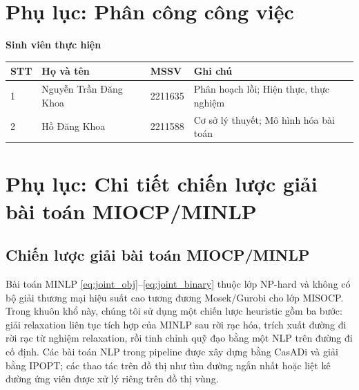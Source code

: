 \addto{}
\appendixtitleon
\appendixtitletocon
\begin{appendices}

    \chapter{Phụ lục: Phân công công việc}
    \label{apd:work_distribution}
    \begin{center}
        {\large \textbf{Sinh viên thực hiện}}
        \vspace{5pt}
        \begin{tabular}{@{}p{1cm}p{5cm}p{2cm}p{6.5cm}@{}}
            \hline
            \textbf{STT} & \textbf{Họ và tên}    & \textbf{MSSV} & \textbf{Ghi chú}                       \\
            \hline
            1            & Nguyễn Trần Đăng Khoa & 2211635       & Phân hoạch lồi; Hiện thực, thực nghiệm \\
            2            & Hồ Đăng Khoa          & 2211588       & Cơ sở lý thuyết; Mô hình hóa bài toán  \\
            \hline
        \end{tabular}
    \end{center}

    \chapter{Phụ lục: Chi tiết chiến lược giải bài toán MIOCP/MINLP}
    \label{apd:A}

    \section{Chiến lược giải bài toán MIOCP/MINLP}
    \label{subsec:solver_strategy}

    Bài toán MINLP \eqref{eq:joint_obj}--\eqref{eq:joint_binary} thuộc lớp NP-hard
    và không có bộ giải thương mại hiệu suất cao tương đương Mosek/Gurobi cho lớp
    MISOCP. Trong khuôn khổ này, chúng tôi sử dụng một chiến lược heuristic gồm ba
    bước: giải relaxation liên tục tích hợp của MINLP sau rời rạc hóa, trích xuất
    đường đi rời rạc từ nghiệm relaxation, rồi tinh chỉnh quỹ đạo bằng một NLP trên
    đường đi cố định. Các bài toán NLP trong pipeline được xây dựng bằng CasADi và
    giải bằng IPOPT; các thao tác trên đồ thị như tìm đường ngắn nhất hoặc liệt kê
    đường ứng viên được xử lý riêng trên đồ thị vùng.


\end{appendices}
